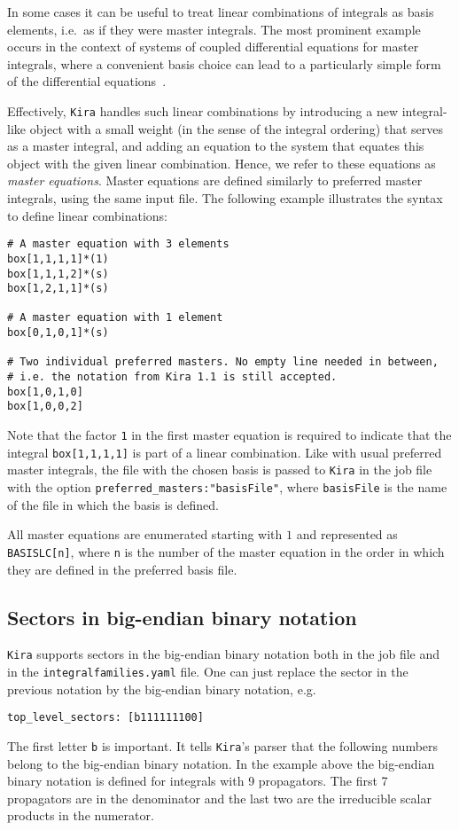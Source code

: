 \documentclass[11pt,a4paper,DIV=11,numbers=noenddot,parskip=half]{scrartcl}
\newcommand{\code}[1]{\texttt{#1}}
\newcommand*{\kira}{\code{Kira}}
\begin{document}
In some cases it can be useful to treat linear combinations of integrals as basis elements, i.e.\ as if they were master integrals.
The most prominent example occurs in the context of systems of coupled differential equations for master integrals, where a convenient basis choice can lead to a particularly simple form of the differential equations~\cite{Henn:2013pwa,Argeri:2014qva}.

Effectively, \kira{} handles such linear combinations by introducing a new integral-like object with a small weight (in the sense of the integral ordering) that serves as a master integral, and adding an equation to the system that equates this object with the given linear combination.
Hence, we refer to these equations as \emph{master equations}.
Master equations are defined similarly to preferred master integrals, using the same input file.
The following example illustrates the syntax to define linear combinations:
%
\begin{verbatim}
# A master equation with 3 elements
box[1,1,1,1]*(1)
box[1,1,1,2]*(s)
box[1,2,1,1]*(s)

# A master equation with 1 element
box[0,1,0,1]*(s)

# Two individual preferred masters. No empty line needed in between,
# i.e. the notation from Kira 1.1 is still accepted.
box[1,0,1,0]
box[1,0,0,2]
\end{verbatim}
%
Note that the factor \verb|1| in the first master equation is required to indicate that the integral \verb|box[1,1,1,1]| is part of a linear combination.
Like with usual preferred master integrals, the file with the chosen basis is passed to \kira{} in the job file with the option \code{preferred\_masters:\;"basisFile"}, where \code{basisFile} is the name of the file in which the basis is defined.

All master equations are enumerated starting with $1$ and represented as \code{BASISLC[n]}, where \code{n} is the number of the master equation in the order in which they are defined in the preferred basis file.


\subsection{Sectors in big-endian binary notation}
\label{subsect:reverse-bit-notation}

\kira{} supports sectors in the big-endian binary notation both in the job file and in the \code{integralfamilies.yaml} file.
One can just replace the sector in the previous notation by the big-endian binary notation, e.g.\
\begin{verbatim}
top_level_sectors: [b111111100]
\end{verbatim}
The first letter \texttt{b} is important.
It tells \kira{}'s parser that the following numbers belong to the big-endian binary notation.
In the example above the big-endian binary notation is defined for integrals with 9 propagators. The first 7 propagators are in the denominator and the last two are the irreducible scalar products in the numerator.
\end{document}
